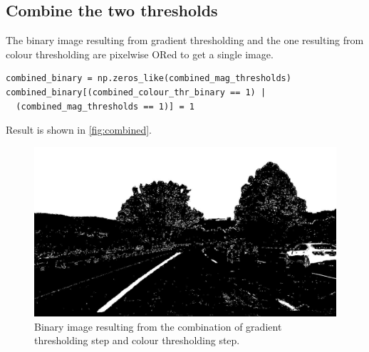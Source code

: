 \documentclass{article}
\begin{document}
\subsection{Combine the two thresholds}
The binary image resulting from gradient thresholding and the one resulting from colour thresholding are pixelwise ORed to get a single image.
\begin{lstlisting}
combined_binary = np.zeros_like(combined_mag_thresholds)
combined_binary[(combined_colour_thr_binary == 1) | 
  (combined_mag_thresholds == 1)] = 1
\end{lstlisting}
Result is shown in \autoref{fig:combined}.
\begin{figure}
\centering
\includegraphics[scale=0.25]{output_images/test1/6_combined_mag_colour_threshold}
\caption{Binary image resulting from the combination of gradient thresholding step and colour thresholding step.}
\label{fig:combined}
\end{figure}
\end{document}
